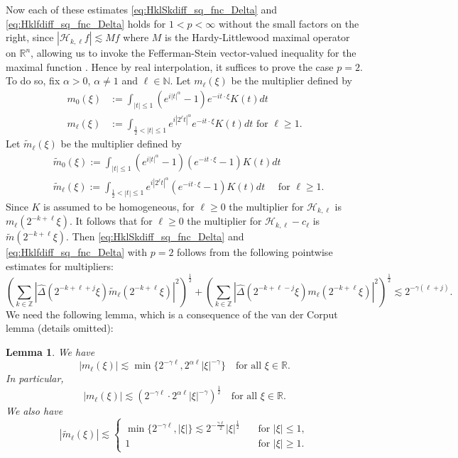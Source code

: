 \documentclass[12pt,leqno]{amsart}
\def\R{\mathbb{R}}
\def\N{\mathbb{N}}
\def\Z{\mathbb{Z}}
\theoremstyle{plain}
\newtheorem{lem}[thm]{Lemma}
\numberwithin{equation}{section}
\begin{document}
Now each of these estimates \eqref{eq:HklSkdiff_sq_fnc_Delta} and \eqref{eq:Hklfdiff_sq_fnc_Delta} holds for $1 < p < \infty$ without the small factors on the right, since  
$|\mathcal{H}_{k,\ell} f| \lesssim M f$ where $M$ is the Hardy-Littlewood maximal operator on $\R^n$, allowing us to invoke the Fefferman-Stein vector-valued inequality for the maximal function \cite[Chapter II.1]{MR1232192}. Hence by real interpolation, it suffices to prove the case $p = 2$. To do so, fix $\alpha > 0$, $\alpha \ne 1$ and $\ell \in \N$. Let $m_{\ell}(\xi)$ be the multiplier defined by
\[
\begin{split}
m_{0}(\xi) &:= \int_{|t| \leq 1} (e^{i|t|^{\alpha}}-1) e^{-it \cdot \xi} K(t)dt \\
m_{\ell}(\xi) &:= \int_{\frac{1}{2} < |t| \leq 1} e^{i  |2^{\ell} t|^{\alpha}} e^{-it \cdot \xi} K(t)dt \text{ for } \ell \ge 1.
\end{split}
\]
Let $\tilde{m}_{\ell}(\xi)$ be the multiplier defined by
\[
\begin{split}
& \tilde{m}_{0}(\xi) := \int_{|t| \leq 1} (e^{i|t|^{\alpha}}-1) (e^{-it \cdot \xi}-1) K(t)dt\\ 
& \tilde{m}_{\ell}(\xi) := \int_{\frac{1}{2} < |t| \leq 1} e^{i |2^{\ell} t|^{\alpha}} (e^{-it \cdot \xi}-1) K(t)dt \quad \text{ for } \ell \ge 1.
\end{split}
\]
Since $K$ is assumed to be homogeneous, for $\ell \geq 0$ the multiplier for $\mathcal{H}_{k,\ell}$ is $m_{\ell}(2^{-k+\ell}\xi)$. It follows that for $\ell \geq 0$ the multiplier for $\mathcal{H}_{k,\ell} - c_{\ell}$ is $\tilde{m}(2^{-k+\ell}\xi)$. Then \eqref{eq:HklSkdiff_sq_fnc_Delta} and \eqref{eq:Hklfdiff_sq_fnc_Delta} with $p = 2$ follows from the following pointwise estimates for multipliers:
\begin{equation}\label{170713e3.12a}
\left( \sum_{k \in \Z} |\widehat{\Delta}(2^{-k+\ell+j} \xi) \tilde{m}_{\ell}(2^{-k+\ell} \xi)|^2 \right)^{\frac{1}{2}}+ \left( \sum_{k \in \Z} |\widehat{\Delta}(2^{-k+\ell-j} \xi) m_{\ell}(2^{-k+\ell} \xi)|^2 \right)^{\frac{1}{2}} \lesssim 2^{-\gamma ( \ell +j)}.
\end{equation}
We need the following lemma, which is a consequence of the van der Corput lemma (details omitted): 

\begin{lem} \label{lem:ml}
We have \begin{equation}\label{170713e3.13a}
|m_{\ell}(\xi)| \lesssim \min \{2^{-\gamma \ell}, 2^{\alpha \ell}|\xi|^{-\gamma}\} \quad \text{for all $\xi \in \R$}.
\end{equation}
In particular,
\begin{equation}\label{170713e3.14a}
|m_{\ell}(\xi)| \lesssim (2^{-\gamma \ell}\cdot 2^{\alpha \ell}|\xi|^{-\gamma})^{\frac{1}{2}} \quad \text{for all $\xi \in \R$}.
\end{equation}
We also have 
\[
|\tilde{m}_{\ell}(\xi)| \lesssim 
\begin{cases} 
\min\{2^{-\gamma \ell}, |\xi|\} \lesssim 2^{-\frac{\gamma \ell}{2}} |\xi|^{\frac{1}{2}} \quad & \text{for $|\xi| \leq 1$}, \\
 1 \quad & \text{for $|\xi| \geq 1$}.
\end{cases}
\]
\end{lem}
\end{document}
